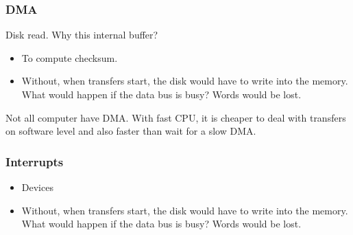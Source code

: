 \begin{frame}
  \frametitle{DMA}
  \begin{block}{Disk read. Why this internal buffer?}
    \begin{itemize}
      \item To compute checksum.
      \item Without, when transfers start, the disk would have to write into the memory. What would happen if the data bus is busy? Words would be lost.
    \end{itemize}
  \end{block}
  Not all computer have DMA. With fast CPU, it is cheaper to deal with transfers on software level and also faster than wait for a slow DMA.
\end{frame}

\begin{frame}
  \frametitle{Interrupts}
  \begin{itemize}
    \item Devices
    \item Without, when transfers start, the disk would have to write into the memory. What would happen if the data bus is busy? Words would be lost.
  \end{itemize}
\end{frame}
